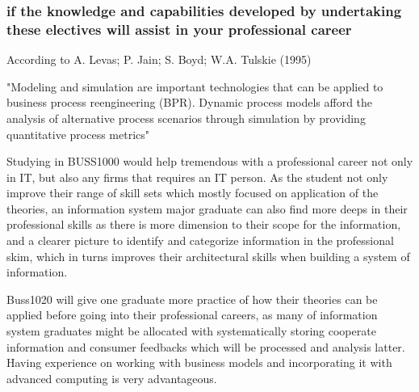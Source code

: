 \documentclass[../draft.tex]{subfiles}
\begin{document}
\subsubsection{if the knowledge and capabilities developed by undertaking these electives will assist in your professional career}
According to A. Levas; P. Jain; S. Boyd; W.A. Tulskie (1995) 
\begin{displayquote}
"Modeling and simulation are important technologies that can be applied to business process reengineering (BPR). Dynamic process models afford the analysis of alternative process scenarios through simulation by providing quantitative process metrics"
\end{displayquote}
	Studying in BUSS1000 would help tremendous with a professional career not only in IT, but also any firms that requires an IT person. As the student not only improve their range of skill sets which mostly focused on application of the theories, an information system major graduate can also find more deeps in their professional skills as there is more dimension to their scope for the information, and a clearer picture to identify and categorize information in the professional skim, which in turns improves their architectural skills when building a system of information.\par
Buss1020 will give one graduate more practice of how their theories can be applied before going into their professional careers, as many of information system graduates might be allocated with systematically storing cooperate information and consumer feedbacks which will be processed and analysis latter. Having experience on working with business models and incorporating it with advanced computing is very advantageous.\par
\end{document}
